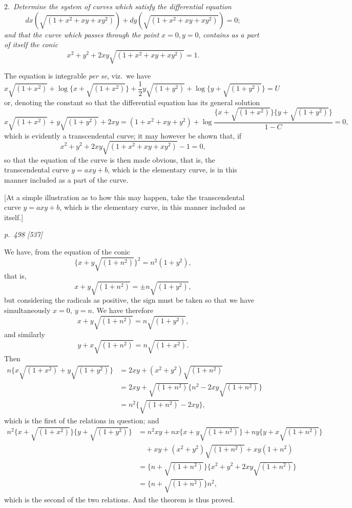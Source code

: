 \documentclass[11pt,a4paper]{article}
\theoremstyle{plain}
\theoremstyle{definition}
\newcommand{\sqr}[1]{\sqrt{(#1)}}
\begin{document}
\smallskip
\noindent\textsc{2.}\, \textit{Determine the system of curves which satisfy the differential equation}
\[
dx(\sqrt{(1 + x^2 + xy + xy^2)}) + dy(\sqrt{(1 + x^2 + xy + xy^2)}) = 0;
\]
\textit{and that the curve which passes through the point} $x = 0, y = 0$, \textit{contains as a part
of itself the conic}
\[
x^2 + y^2 + 2xy\sqrt{(1 + x^2 + xy + xy^2)} = 1.
\]

The equation is integrable \textit{per se}, viz.\ we have
\[
x\sqrt{(1 + x^2)} + \log\{x + \sqrt{(1 + x^2)}\} + \frac{1}{2}y\sqrt{(1 + y^2)} + \log\{y + \sqrt{(1 + y^2)}\} = U
\]
or, denoting the constant so that the differential equation has its general solution
\[
x\sqrt{(1 + x^2)} + y\sqrt{(1 + y^2)} + 2xy = (1 + x^2 + xy + y^2) + \log\frac{\{x + \sqrt{(1 + x^2)}\}\{y + \sqrt{(1 + y^2)}\}}{1 - C} = 0,
\]
which is evidently a transcendental curve; it may however be shown that, if
\[
x^2 + y^2 + 2xy\sqrt{(1 + x^2 + xy + xy^2)} - 1 = 0,
\]
so that the equation of the curve is then made obvious, that is, the transcendental
curve $y = a x y + b$, which is the elementary curve, is in this manner included as a part of the curve.

[At a simple illustration as to how this may happen, take the transcendental
curve $y = a x y + b$, which is the elementary curve, in this manner included as itself.]

\clearpage

\bigskip
\textit{p.~498 [537]}
\smallskip

We have, from the equation of the conic
\[
\{x+y\sqr{1+n^2}\}^2=n^2(1+y^2),
\]
that is,
\[
x+y\sqr{1+n^2}=\pm n\sqr{1+y^2},
\]
but considering the radicals as positive, the sign must be taken so that we have
simultaneously \(x=0,\ y=n\). We have therefore
\[
x+y\sqr{1+n^2}=n\sqr{1+y^2},
\]
and similarly
\[
y+x\sqr{1+n^2}=n\sqr{1+x^2}.
\]
Then
\begin{align*}
n\{x\sqr{1+x^2}+y\sqr{1+y^2}\}
&=2xy+(x^2+y^2)\sqr{1+n^2} \\
&=2xy+\sqr{1+n^2}\{n^2-2xy\sqr{1+n^2}\} \\
&=n^2\{\sqr{1+n^2}-2xy\},
\end{align*}
which is the first of the relations in question; and
\begin{align*}
n^2\{x+\sqr{1+x^2}\}\{y+\sqr{1+y^2}\}
&=n^2xy+nx\{x+y\sqr{1+n^2}\}+ny\{y+x\sqr{1+n^2}\} \\
&\quad +xy+(x^2+y^2)\sqr{1+n^2}+xy(1+n^2) \\
&=\{n+\sqr{1+n^2}\}\{x^2+y^2+2xy\sqr{1+n^2}\} \\
&=\{n+\sqr{1+n^2}\}n^2,
\end{align*}
which is the second of the two relations. And the theorem is thus proved.
\end{document}
